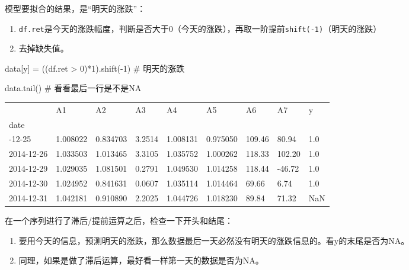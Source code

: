 \documentclass[
  letterpaper,
  DIV=11,
  numbers=noendperiod]{scrreprt}
\newenvironment{Shaded}{\begin{snugshade}}{\end{snugshade}}
\newcommand{\CommentTok}[1]{\textcolor[rgb]{0.37,0.37,0.37}{#1}}
\newcommand{\DecValTok}[1]{\textcolor[rgb]{0.68,0.00,0.00}{#1}}
\newcommand{\NormalTok}[1]{\textcolor[rgb]{0.00,0.23,0.31}{#1}}
\newcommand{\OperatorTok}[1]{\textcolor[rgb]{0.37,0.37,0.37}{#1}}
\newcommand{\StringTok}[1]{\textcolor[rgb]{0.13,0.47,0.30}{#1}}
\providecommand{\tightlist}{%
  \setlength{\itemsep}{0pt}\setlength{\parskip}{0pt}}\usepackage{longtable,booktabs,array}
\begin{document}
模型要拟合的结果，是``明天的涨跌''：

\begin{enumerate}
\def\labelenumi{\arabic{enumi}.}
\tightlist
\item
  \texttt{df.ret}是今天的涨跌幅度，判断是否大于0（今天的涨跌），再取一阶提前\texttt{shift(-1)}（明天的涨跌）
\item
  去掉缺失值。
\end{enumerate}

\begin{Shaded}
\begin{Highlighting}[]
\NormalTok{data[}\StringTok{\textquotesingle{}y\textquotesingle{}}\NormalTok{] }\OperatorTok{=}\NormalTok{ ((df.ret }\OperatorTok{\textgreater{}} \DecValTok{0}\NormalTok{)}\OperatorTok{*}\DecValTok{1}\NormalTok{).shift(}\OperatorTok{{-}}\DecValTok{1}\NormalTok{) }\CommentTok{\# 明天的涨跌}

\NormalTok{data.tail() }\CommentTok{\# 看看最后一行是不是NA}
\end{Highlighting}
\end{Shaded}

\begin{longtable}[]{@{}lllllllll@{}}
\toprule\noalign{}
& A1 & A2 & A3 & A4 & A5 & A6 & A7 & y \\
date & & & & & & & & \\
\midrule\noalign{}
\endhead
\bottomrule\noalign{}
\endlastfoot
2014-12-25 & 1.008022 & 0.834703 & 3.2514 & 1.008131 & 0.975050 & 109.46
& 80.94 & 1.0 \\
2014-12-26 & 1.033503 & 1.013465 & 3.3105 & 1.035752 & 1.000262 & 118.33
& 102.20 & 1.0 \\
2014-12-29 & 1.029035 & 1.081501 & 0.2791 & 1.049530 & 1.014258 & 118.44
& -46.72 & 1.0 \\
2014-12-30 & 1.024952 & 0.841631 & 0.0607 & 1.035114 & 1.014464 & 69.66
& 6.74 & 1.0 \\
2014-12-31 & 1.042181 & 0.910890 & 2.2025 & 1.044726 & 1.018230 & 89.84
& 71.32 & NaN \\
\end{longtable}

在一个序列进行了滞后/提前运算之后，检查一下开头和结尾：

\begin{enumerate}
\def\labelenumi{\arabic{enumi}.}
\tightlist
\item
  要用今天的信息，预测明天的涨跌，那么数据最后一天必然没有明天的涨跌信息的。看y的末尾是否为NA。
\item
  同理，如果是做了滞后运算，最好看一样第一天的数据是否为NA。
\end{enumerate}
\end{document}
